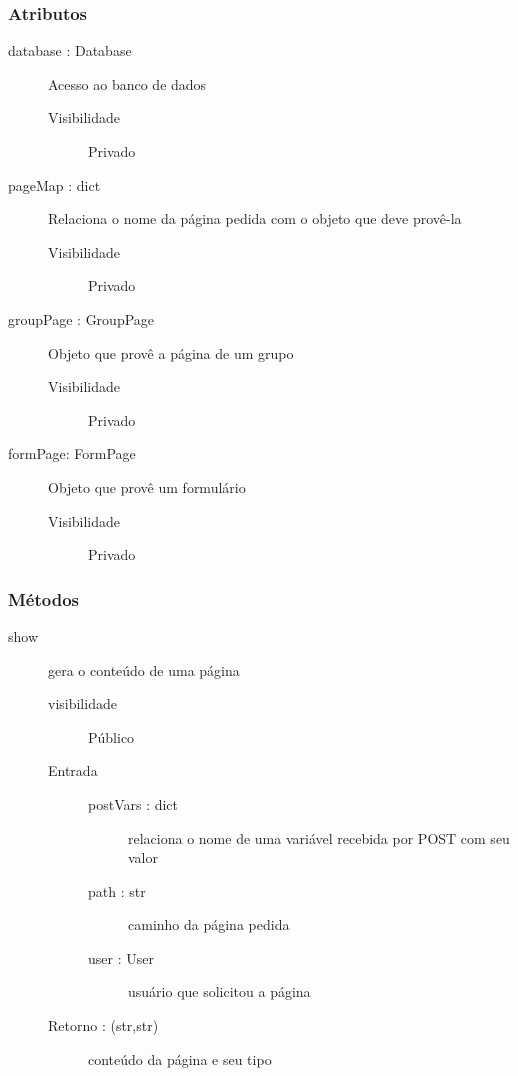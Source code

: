 \documentclass[a4paper]{article}
\begin{document}
	\subsubsection{Atributos}
		\begin{description}
		 \item [database : Database] Acesso ao banco de dados
			\begin{description}
			 \item [Visibilidade] Privado
			\end{description}
			
			\item [pageMap : dict] Relaciona o nome da página pedida com o objeto que deve provê-la
			\begin{description}
			 \item [Visibilidade] Privado
			\end{description}
			
			\item [groupPage : GroupPage] Objeto que provê a página de um grupo
			\begin{description}
			 \item [Visibilidade] Privado
			\end{description}
			
			\item [formPage: FormPage] Objeto que provê um formulário
			\begin{description}
			 \item [Visibilidade] Privado
			\end{description}

		\end{description}
		
		\subsubsection{Métodos}
		\begin{description} %
		 \item [show] gera o conteúdo de uma página
			\begin{description} %
			 \item [visibilidade] Público
			 \item [Entrada] \mbox{}
				\begin{description} %
				 \item [postVars : dict] relaciona o nome de uma variável recebida por POST com seu valor
				 \item [path : str] caminho da página pedida
				 \item [user : User] usuário que solicitou a página
				\end{description} %
				
				\item [Retorno : (str,str)] conteúdo da página e seu tipo
				
				\end{description} %
				
			\end{description} %
	
\end{document}
